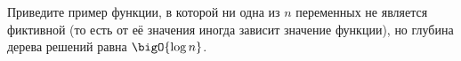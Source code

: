 Приведите пример функции, в которой ни одна из $n$ переменных не является фиктивной (то есть от её
значения иногда зависит значение функции), но глубина дерева решений равна $\bigO{\log n}$.
